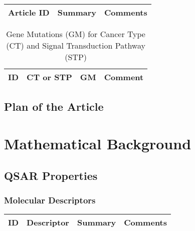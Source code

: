 \begin{table}[H]\centering
	\begin{tabular}{p{1cm}p{4cm}p{3cm}}
		Article ID & Summary & Comments\\
		\hline
		\hline
	\end{tabular}
\end{table}


\begin{table}[H]
\tiny
\caption{Gene Mutations (GM) for Cancer Type (CT) and Signal Transduction Pathway (STP)}
\begin{tabular}{rp{2cm}p{4cm}p{0.5cm}}
\hline 
ID & CT or STP & GM & Comment \\ 
\hline 	
\hline
\end{tabular}
\end{table}

\subsection{Plan of the Article}

\begin{enumerate}
\end{enumerate}


\section{Mathematical Background}


\subsection{QSAR Properties}

\subsubsection{Molecular Descriptors}

\begin{table}[H]\centering
	\begin{tabular}{p{1cm}p{2cm}p{4cm}p{3cm}}
		ID & Descriptor & Summary & Comments\\
		\hline
		\hline
	\end{tabular}
\end{table}


